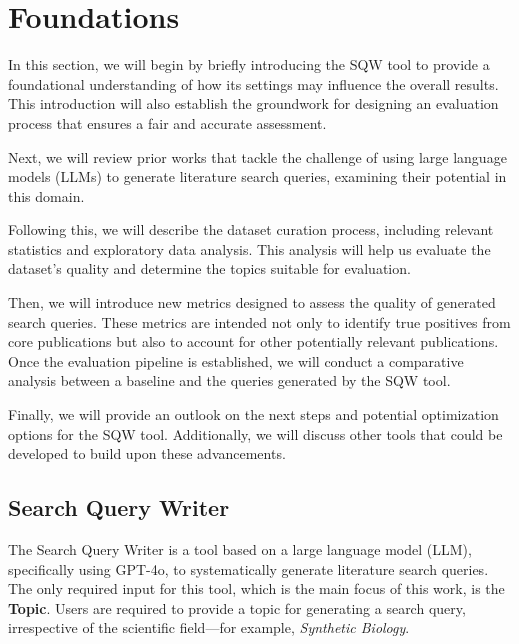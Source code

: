 \chapter{Foundations}\label{ch:foundations}

In this section, we will begin by briefly introducing the SQW tool to provide a foundational understanding of how its settings may influence the overall results. This introduction will also establish the groundwork for designing an evaluation process that ensures a fair and accurate assessment.

Next, we will review prior works that tackle the challenge of using large language models (LLMs) to generate literature search queries, examining their potential in this domain.

Following this, we will describe the dataset curation process, including relevant statistics and exploratory data analysis. This analysis will help us evaluate the dataset's quality and determine the topics suitable for evaluation.

Then, we will introduce new metrics designed to assess the quality of generated search queries. These metrics are intended not only to identify true positives from core publications but also to account for other potentially relevant publications. Once the evaluation pipeline is established, we will conduct a comparative analysis between a baseline and the queries generated by the SQW tool.

Finally, we will provide an outlook on the next steps and potential optimization options for the SQW tool. Additionally, we will discuss other tools that could be developed to build upon these advancements.


\section{Search Query Writer}\label{sec:sqw}
The Search Query Writer is a tool based on a large language model (LLM), specifically using GPT-4o, to systematically generate literature search queries. The only required input for this tool, which is the main focus of this work, is the \textbf{Topic}. Users are required to provide a topic for generating a search query, irrespective of the scientific field—for example, \textit{Synthetic Biology}. 

